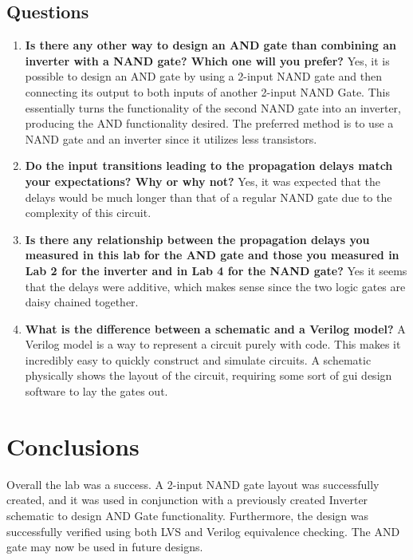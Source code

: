 \documentclass[12pt]{article}
\begin{document}
\subsection{Questions}
\begin{enumerate}
	\item \textbf{Is there any other way to design an AND gate than combining an inverter with a NAND gate? Which one will you prefer?} Yes, it is possible to design an AND gate by using a 2-input NAND gate and then connecting its output to both inputs of another 2-input NAND Gate. This essentially turns the functionality of the second NAND gate into an inverter, producing the AND functionality desired. The preferred method is to use a NAND gate and an inverter since it utilizes less transistors.
	
	\item \textbf{Do the input transitions leading to the propagation delays match your expectations? Why or why not?} Yes, it was expected that the delays would be much longer than that of a regular NAND gate due to the complexity of this circuit.
	
	\item \textbf{Is there any relationship between the propagation delays you measured in this lab for the AND gate and those you measured in Lab 2 for the inverter and in Lab 4 for the NAND gate?} Yes it seems that the delays were additive, which makes sense since the two logic gates are daisy chained together.
	
	\item \textbf{What is the difference between a schematic and a Verilog model?} A Verilog model is a way to represent a circuit purely with code. This makes it incredibly easy to quickly construct and simulate circuits. A schematic physically shows the layout of the circuit, requiring some sort of gui design software to lay the gates out.
\end{enumerate}
	
\section{Conclusions}
Overall the lab was a success. A 2-input NAND gate layout was successfully created, and it was used in conjunction with a previously created Inverter schematic to design AND Gate functionality. Furthermore, the design was successfully verified using both LVS and Verilog equivalence checking. The AND gate may now be used in future designs. 
\end{document}
